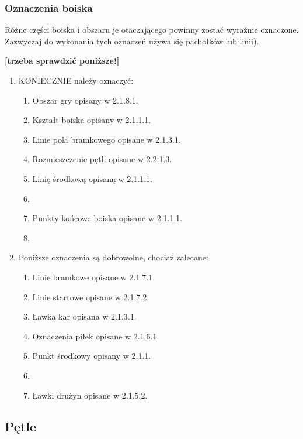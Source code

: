 \documentclass[12pt]{article}
\begin{document}
\subsubsection{Oznaczenia boiska}

Różne części boiska i obszaru je otaczającego powinny zostać wyraźnie
oznaczone. Zazwyczaj do wykonania tych oznaczeń używa się pachołków lub
linii).

\textbf{[trzeba sprawdzić poniższe!]}

\begin{enumerate}
	\item
	      KONIECZNIE należy oznaczyć:

	      \begin{enumerate}
		      \item Obszar gry opisany w 2.1.8.1.
		      \item Kształt boiska opisany w 2.1.1.1.
		      \item Linie pola bramkowego opisane w 2.1.3.1.
		      \item Rozmieszczenie pętli opisane w 2.2.1.3.
		      \item Linię środkową opisaną w 2.1.1.1.\item
		      \item Punkty końcowe boiska opisane w 2.1.1.1.\item
	      \end{enumerate}

	\item Poniższe oznaczenia są dobrowolne, chociaż zalecane:
	      \begin{enumerate}
		      \item Linie bramkowe opisane w 2.1.7.1.
		      \item Linie startowe opisane w 2.1.7.2.
		      \item Ławka kar opisana w 2.1.3.1.
		      \item Oznaczenia piłek opisane w 2.1.6.1.
		      \item Punkt środkowy opisany w 2.1.1.\item
		      \item Ławki drużyn opisane w 2.1.5.2.
	      \end{enumerate}
\end{enumerate}

\subsection{Pętle}
\end{document}
